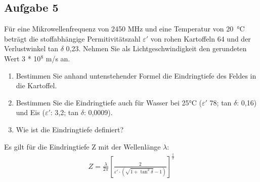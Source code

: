 \documentclass[a4paper,11pt]{article}
\newif\ifshowme
\begin{document}
%
%
%
%
%
%


\subsection*{Aufgabe 5}
Für eine Mikrowellenfrequenz von 2450 MHz und eine Temperatur von \mbox{20 °C} beträgt die
stoffabhängige Permitivitätszahl $\varepsilon '$ von rohen Kartoffeln 64 und der Verlustwinkel tan $\delta$ 0,23.
Nehmen Sie als Lichtgeschwindigkeit den gerundeten Wert 3 * 10$^8$ m/s an.
\begin{enumerate}[label=\alph*)]

\item Bestimmen Sie anhand untenstehender Formel die Eindringtiefe des Feldes in die
Kartoffel.
\item Bestimmen Sie die Eindringtiefe auch für Wasser bei 25°C ($\varepsilon '$ 78; tan $\delta$: 0,16) und Eis
($\varepsilon '$: 3,2; tan $\delta$: 0,0009).
\item Wie ist die Eindringtiefe definiert?

\end{enumerate}
Es gilt für die Eindringtiefe Z mit der Wellenlänge $\lambda$: 
\begin{align*}
Z = \frac{\lambda}{2 \pi} \left[ \frac{2}{\varepsilon ' \cdot (\sqrt{1+ \tan^2 \delta} - 1)} \right]^{\frac{1}{2}}
\end{align*}
\end{document}
